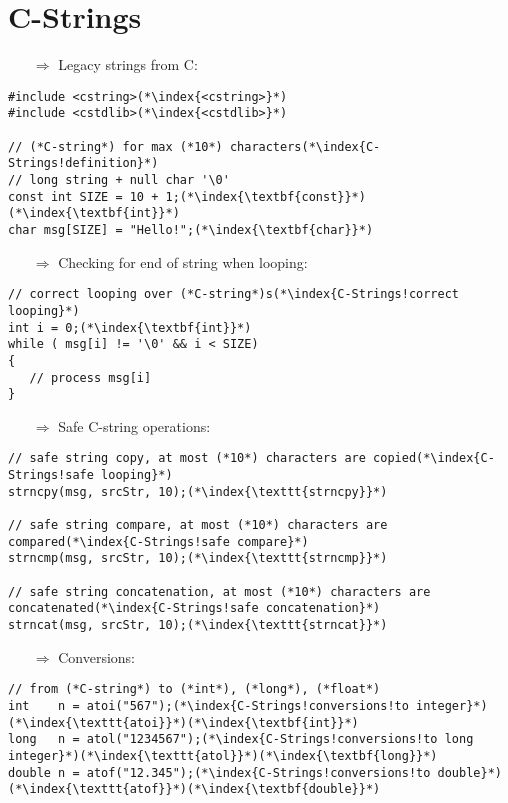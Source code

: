 \documentclass[10pt]{article}
\begin{document}
\section{C-Strings}
\small
\begin{enumerate}
\item[$\Rightarrow$] Legacy strings from C:
\end{enumerate}
\begin{lstlisting}
#include <cstring>(*\index{<cstring>}*)
#include <cstdlib>(*\index{<cstdlib>}*)

// (*C-string*) for max (*10*) characters(*\index{C-Strings!definition}*)
// long string + null char '\0'
const int SIZE = 10 + 1;(*\index{\textbf{const}}*)(*\index{\textbf{int}}*)
char msg[SIZE] = "Hello!";(*\index{\textbf{char}}*)
\end{lstlisting}
\begin{enumerate}
\item[$\Rightarrow$] Checking for end of string when looping:
\end{enumerate}
\begin{lstlisting}
// correct looping over (*C-string*)s(*\index{C-Strings!correct looping}*)
int i = 0;(*\index{\textbf{int}}*)
while ( msg[i] != '\0' && i < SIZE)
{
   // process msg[i]
}
\end{lstlisting}
\begin{enumerate}
\item[$\Rightarrow$] Safe C-string operations:
\end{enumerate}
\begin{lstlisting}
// safe string copy, at most (*10*) characters are copied(*\index{C-Strings!safe looping}*)
strncpy(msg, srcStr, 10);(*\index{\texttt{strncpy}}*)

// safe string compare, at most (*10*) characters are compared(*\index{C-Strings!safe compare}*)
strncmp(msg, srcStr, 10);(*\index{\texttt{strncmp}}*)

// safe string concatenation, at most (*10*) characters are concatenated(*\index{C-Strings!safe concatenation}*)
strncat(msg, srcStr, 10);(*\index{\texttt{strncat}}*)
\end{lstlisting}
\begin{enumerate}
\item[$\Rightarrow$] Conversions:
\end{enumerate}
\begin{lstlisting}
// from (*C-string*) to (*int*), (*long*), (*float*)
int    n = atoi("567");(*\index{C-Strings!conversions!to integer}*)(*\index{\texttt{atoi}}*)(*\index{\textbf{int}}*)
long   n = atol("1234567");(*\index{C-Strings!conversions!to long integer}*)(*\index{\texttt{atol}}*)(*\index{\textbf{long}}*)
double n = atof("12.345");(*\index{C-Strings!conversions!to double}*)(*\index{\texttt{atof}}*)(*\index{\textbf{double}}*)
\end{lstlisting}
%
%
\end{document}
